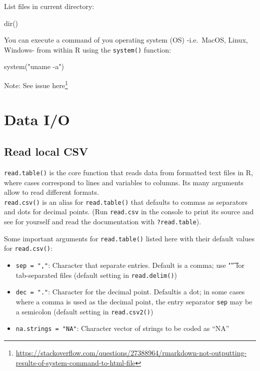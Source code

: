 \documentclass[
]{book}
\newenvironment{Shaded}{\begin{snugshade}}{\end{snugshade}}
\newcommand{\FunctionTok}[1]{\textcolor[rgb]{0.00,0.00,0.00}{#1}}
\newcommand{\NormalTok}[1]{#1}
\newcommand{\StringTok}[1]{\textcolor[rgb]{0.31,0.60,0.02}{#1}}
\DeclareRobustCommand{\href}[2]{#2\footnote{\url{#1}}}
\providecommand{\tightlist}{%
  \setlength{\itemsep}{0pt}\setlength{\parskip}{0pt}}
\renewcommand{\href}[2]{#2\footnote{\url{#1}}}
\begin{document}
List files in current directory:

\begin{Shaded}
\begin{Highlighting}[]
\FunctionTok{dir}\NormalTok{()}
\end{Highlighting}
\end{Shaded}

You can execute a command of you operating system (OS) -i.e.~MacOS, Linux, Windows- from within R using the \texttt{system()} function:

\begin{Shaded}
\begin{Highlighting}[]
\FunctionTok{system}\NormalTok{(}\StringTok{"uname {-}a"}\NormalTok{)}
\end{Highlighting}
\end{Shaded}

Note: See issue \href{https://stackoverflow.com/questions/27388964/rmarkdown-not-outputting-results-of-system-command-to-html-file}{here}

\hypertarget{data-io}{%
\section{Data I/O}\label{data-io}}

\hypertarget{read-local-csv}{%
\subsection{Read local CSV}\label{read-local-csv}}

\texttt{read.table()} is the core function that reads data from formatted text files in R, where cases correspond to lines and variables to columns. Its many arguments allow to read different formats.\\
\texttt{read.csv()} is an alias for \texttt{read.table()} that defaults to commas as separators and dots for decimal points. (Run \texttt{read.csv} in the console to print its source and see for yourself and read the documentation with \texttt{?read.table}).

Some important arguments for \texttt{read.table()} listed here with their default values for \texttt{read.csv()}:

\begin{itemize}
\tightlist
\item
  \texttt{sep\ =\ ","}: Character that separate entries. Default is a comma; use "\t" for tab-separated files (default setting in \texttt{read.delim()})
\item
  \texttt{dec\ =\ "."}: Character for the decimal point. Defaultis a dot; in some cases where a comma is used as the decimal point, the entry separator \texttt{sep} may be a semicolon (default setting in \texttt{read.csv2()})
\item
  \texttt{na.strings\ =\ "NA"}: Character vector of strings to be coded as ``NA''
\end{itemize}
\end{document}
